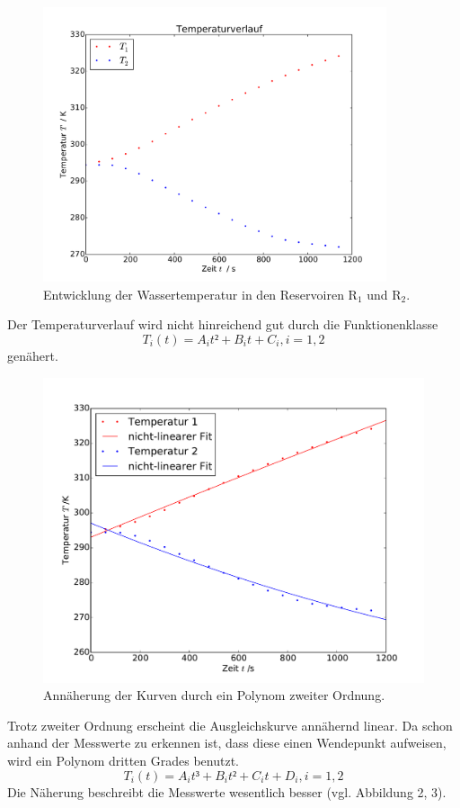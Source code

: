 \begin{figure}
	\centering
	\includegraphics[width=0.9\textwidth]{Bilder/Temperaturverlauf.pdf}
	\caption{Entwicklung der Wassertemperatur in den Reservoiren $\mathup{R_1}$ und $\mathup{R_2}$.}
	\label{fig:temperaturverlauf}
\end{figure}

Der Temperaturverlauf wird nicht hinreichend gut durch die Funktionenklasse
\begin{equation}
	T_i(t)=A_i t² + B_i t + C_i , i=1,2
	\label{eq:t-verlauf_Grad2}
\end{equation}
genähert. 
\begin{figure}
	\includegraphics[width=\textwidth]{Bilder/Temperaturfit_Grad2.pdf}
	\caption{Annäherung der Kurven durch ein Polynom zweiter Ordnung.}
\end{figure}
\newpage
Trotz zweiter Ordnung erscheint die Ausgleichskurve annähernd linear.
Da schon anhand der Messwerte zu erkennen ist, dass diese einen Wendepunkt aufweisen, wird ein Polynom dritten Grades benutzt. 
\begin{equation}
	T_i(t)=A_i t³ + B_i t² + C_i t + D_i , i=1,2
	\label{eq:t-verlauf_Grad3}
\end{equation}
Die Näherung beschreibt die Messwerte wesentlich besser (vgl. Abbildung 2, 3). 

